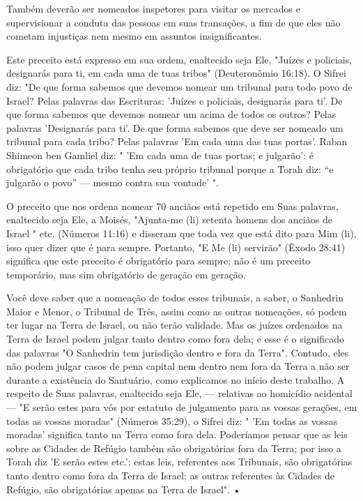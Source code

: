 Também deverão ser nomeados inspetores para visitar os mercados e
supervisionar a conduta das pessoas em suas transações, a fim de que
eles não cometam injustiças nem mesmo em assuntos insignificantes.

Este preceito está expresso em sua ordem, enaltecido seja Ele, "Juí­zes
e policiais, designarás para ti, em cada uma de tuas tribos"
(Deuteronômio 16:18). O Sifrei diz: "De que forma sabemos que devemos
nomear um tribunal para todo povo de Israel? Pelas palavras das
Escrituras: 'Juízes e policiais, desig­narás para ti'. De que forma
sabemos que devemos nomear um acima de todos 
os outros? Pelas palavras 'Designarás para ti'. De que forma sabemos
que deve ser nomeado um tribunal para cada tribo? Pelas palavras 'Em
cada uma das tuas portas'. Raban Shimeon ben Gamliel diz: " 'Em cada uma
de tuas por­tas; e julgarão': é obrigatório que cada tribo tenha seu
próprio tribunal porque a Torah diz: ``e julgarão o povo'' --- mesmo
contra sua vontade' ".

O preceito que nos ordena nomear 70 anciãos está repetido em Suas
palavras, enaltecido seja Ele, a Moisés, "Ajunta-me (li) setenta homens
dos an­ciãos de Israel " etc. (Números 11:16) e disseram que toda vez
que está dito para Mim (li), isso quer dizer que é para sempre.
Portanto, "E Me (li) servirão" (Êxodo 28:41) significa que este preceito
é obrigatório para sempre; não é um preceito temporário, mas sim
obrigatório de geração em geração.

Você deve saber que a nomeação de todos esses tribunais, a saber, o
Sanhedrin Maior e Menor, o Tribunal de Três, assim como as outras
nomea­ções, só podem ter lugar na Terra de Israel, ou não terão
validade. Mas os juízes ordenados na Terra de Israel podem julgar tanto
dentro como fora dela; e esse é o significado das palavras "O Sanhedrin
tem jurisdição dentro e fora da Ter­ra". Contudo, eles não podem julgar
casos de pena capital nem dentro nem fora da Terra a não ser durante a
existência do Santuário, como explicamos no início deste trabalho. A
respeito de Suas palavras, enaltecido seja Ele, --- relati­vas ao
homicídio acidental --- "E serão estes para vós por estatuto de
julgamen­to para as vossas gerações, em todas as vossas moradas"
(Números 35:29), o Sifrei diz: " 'Em todas as vossas moradas' significa
tanto na Terra como fora dela. Poderíamos pensar que as leis sobre as
Cidades de Refúgio também são obrigatórias fora da Terra; por isso a
Torah diz 'E serão estes etc.': estas leis, referentes aos Tribunais,
são obrigatórias tanto dentro como fora da Terra de Israel; as outras
referentes às Cidades de Refúgio, são obrigatórias apenas na Terra de
Israel". •


